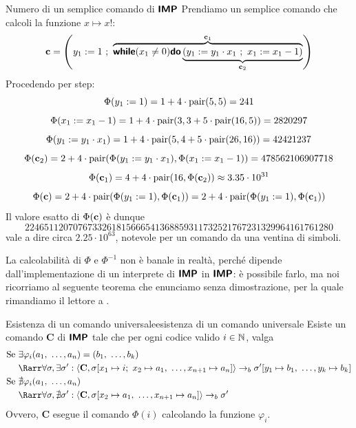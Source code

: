 \documentclass[openany]{book}
\begin{document}
\begin{example}{Numero di un semplice comando di $\text{\sffamily\textbf{IMP}}$}{}
    Prendiamo un semplice comando che calcoli la funzione $x\mapsto x!$:
    \[ \c = \left( y_1 := 1\ ;\ \overbrace{\while(x_1 \neq 0)\doc\underbrace{(y_1 := y_1 \cdot x_1\ ;\ x_1 := x_1 - 1)}_{\c_2}}^{\c_1} \right) \]
    Procedendo per step:
    \[ \Phi(y_1 := 1) = 1+4\cdot\operatorname{pair}(5,5) =241 \]
    \[ \Phi(x_1 := x_1-1) = 1+4\cdot \operatorname{pair} (3, 3+5\cdot \operatorname{pair}(16,5)) = 2820297 \]
    \[ \Phi(y_1:=y_1\cdot x_1) = 1+4\cdot \operatorname{pair}(5, 4+5\cdot\operatorname{pair}(26,16)) = 42421237 \]
    \[ \Phi(\mathbf{c}_2) = 2+4\cdot\operatorname{pair}( \Phi(y_1 := y_1\cdot x_1), \Phi(x_1 := x_1-1) ) = 478562106907718 \]
    \[ \Phi(\mathbf{c}_1) = 4+4\cdot\operatorname{pair}(16,\Phi(\mathbf{c}_2)) \approx 3.35\cdot 10^{31} \]
    \[ \Phi(\mathbf{c}) = 2+4\cdot\operatorname{pair}(\Phi(y_1 := 1) ,\Phi(\mathbf{c}_1) ) = 2+4\cdot\operatorname{pair}(\Phi(y_1 := 1) ,\Phi(\mathbf{c}_1) )\]
    Il valore esatto di $\Phi(\mathbf{c})$ è dunque
    \[2246511207076733261815666541368859311732521767231329964161761280\]
    vale a dire circa $2.25\cdot 10^{63}$, notevole per un comando da una ventina di simboli.
\end{example}

La calcolabilità di $\Phi$ e $\Phi^{-1}$ non è banale in realtà, perché dipende dall'implementazione di un interprete di $\text{\sffamily\textbf{IMP}}$ in $\text{\sffamily\textbf{IMP}}$: è possibile farlo, ma noi ricorriamo al seguente teorema che enunciamo senza dimostrazione, per la quale rimandiamo il lettore a \cite{Rogers1967}.

\begin{theorem}{Esistenza di un comando universale}{esistenza di un comando universale}
    Esiste un comando $\mathbf{C}$ di $\text{\sffamily\textbf{IMP}}$ tale che per ogni codice valido $i \in \mathbb{N}$, valga 
    \begin{align*}
        \text{Se }& \exists \varphi_i(a_1,\ \dots ,a_n) = (b_1,\ \dots,b_k) \\
        & \Rarr \forall\sigma, \exists\sigma' : \langle \mathbf{C}, \sigma[x_1\mapsto i;\ x_2\mapsto a_1,\ \dots, x_{n+1}\mapsto a_n] \rangle \to_b \sigma'[y_1\mapsto b_1,\ \dots, y_k\mapsto b_k] \\
        \text{Se } &\nexists \varphi_i(a_1,\ \dots , a_n ) \\
        & \Rarr \forall\sigma, \nexists\sigma' : \langle \mathbf{C}, \sigma[x_2\mapsto a_1,\ \dots, x_{n+1}\mapsto a_n] \rangle \to_b \sigma'
    \end{align*}
    Ovvero, $\mathbf{C}$ esegue il comando $\Phi(i)$ calcolando la funzione $\varphi_i$.
\end{theorem}
\end{document}
